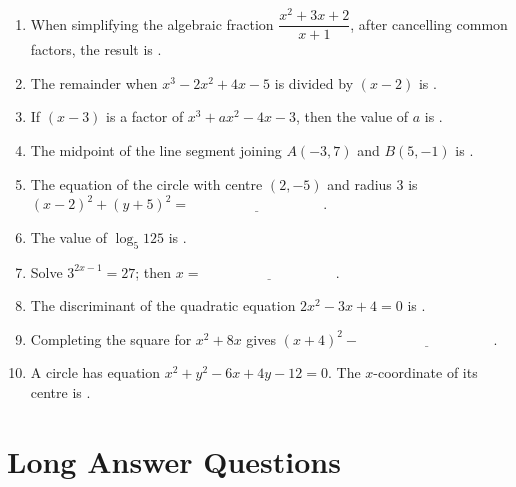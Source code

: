 \documentclass{../Templates/sbs-exam}
\begin{document}
\begin{enumerate}
    \item When simplifying the algebraic fraction $\dfrac{x^2+3x+2}{x+1}$, after cancelling common factors, the result is \underline{\hspace{4cm}}.
    
    \item The remainder when $x^3-2x^2+4x-5$ is divided by $(x-2)$ is \underline{\hspace{4cm}}.
    
    \item If $(x-3)$ is a factor of $x^3+ax^2-4x-3$, then the value of $a$ is \underline{\hspace{4cm}}.
    
    \item The midpoint of the line segment joining $A(-3,7)$ and $B(5,-1)$ is \underline{\hspace{4cm}}.
    
    \item The equation of the circle with centre $(2,-5)$ and radius $3$ is $(x-2)^2+(y+5)^2 = \underline{\hspace{4cm}}$.
    
    \item The value of $\log_5 125$ is \underline{\hspace{4cm}}.
    
    \item Solve $3^{2x-1}=27$; then $x = \underline{\hspace{4cm}}$.
    
    \item The discriminant of the quadratic equation $2x^2-3x+4=0$ is \underline{\hspace{4cm}}.
    
    \item Completing the square for $x^2+8x$ gives $(x+4)^2 - \underline{\hspace{4cm}}$.
    
    \item A circle has equation $x^2+y^2-6x+4y-12=0$. The $x$-coordinate of its centre is \underline{\hspace{4cm}}.
\end{enumerate}

\newpage

\section*{Long Answer Questions}
\end{document}
